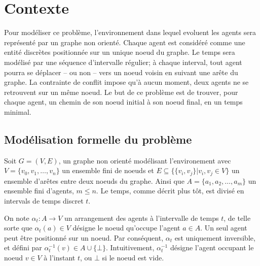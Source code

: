 \documentclass[french, 12pt, letterpaper]{article}
\theoremstyle{definition}
\theoremstyle{proposition}
\theoremstyle{example}
\begin{document}
    \newpage
    \section{Contexte}

    Pour modéliser ce problème, l'environnement dans lequel evoluent les agents sera représenté par un graphe non orienté. 
    Chaque agent est considéré comme une entité discrètes positionnée sur un unique noeud du graphe.
    Le temps sera modélisé par une séquence d'intervalle régulier; à chaque interval, 
    tout agent pourra se déplacer -- ou non -- vers un noeud voisin en suivant une arête du graphe.
    La contrainte de conflit impose qu'à aucun moment, deux agents ne se retrouvent sur un même noeud.
    Le but de ce problème est de trouver, pour chaque agent, un chemin de son noeud initial à son noeud final, en un temps minimal. 

    \subsection{Modélisation formelle du problème}

    Soit $G = ( V, E )$, un graphe non orienté modélisant l'environement avec $V = \{v_0, v_1, \dots, v_n\}$ un ensemble fini de noeuds et 
    $E \subseteq \{\{v_i, v_j\}|v_i, v_j \in V\}$ un ensemble d'arêtes entre deux noeuds du graphe. 
    Ainsi que $A = \{a_1, a_2, \ldots, a_m\}$ un ensemble fini d'agents, $m \leq n$. 
    Le temps, comme décrit plus tôt, est divisé en intervals de temps discret $t$.

    On note $\alpha_t : A \rightarrow V$ un arrangement des agents à l'intervalle de temps $t$, 
    de telle sorte que $\alpha_t(a)\in V$ désigne le noeud qu'occupe l'agent $a \in A$. 
    Un seul agent peut être positionné sur un noeud.
    Par conséquent, $\alpha_t$ est uniquement inversible, et défini par $\alpha^{-1}_t(v) \in A \cup \{\bot\}$.
    Intuitivement, $\alpha^{-1}_t$ désigne l'agent occupant le noeud $v \in V$ à l'instant $t$, ou $\bot$ si le noeud est vide.
\end{document}
